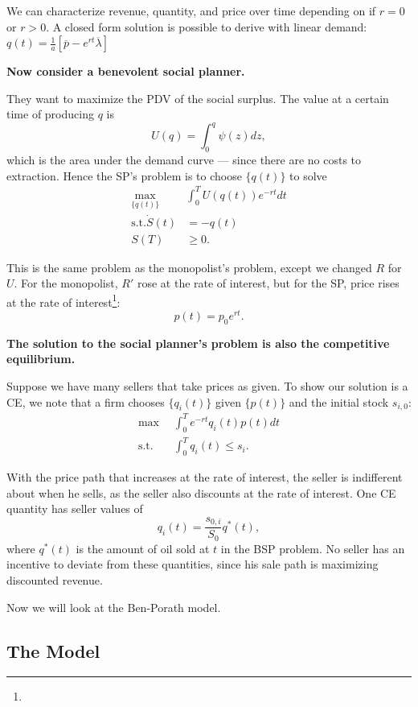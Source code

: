 \documentclass{tufte-handout}
\theoremstyle{definition}
\begin{document}
We can characterize revenue, quantity, and price over time depending on if $r=0$ or $r > 0$. A closed form solution is possible to derive with linear demand: $q(t) = \frac{1}{a} \left[ \overline{p} - e^{rt} \overline{\lambda} \right] $

\textbf{Now consider a benevolent social planner.}

They want to maximize the PDV of the social surplus. The value at a certain time of producing $q$ is \[
	U(q) = \int_{0}^{q} \psi(z)dz 
,\] which is the area under the demand curve --- since there are no costs to extraction. Hence the SP's problem is to choose $\{q(t)\}$ to solve
\begin{align*}
	\max_{\{q(t)\}} &\int_{0}^{T} U(q(t))e^{-rt}dt  \\
	\text{s.t.} \dot{S}(t) &=  -q(t) \\
	S(T) &\ge 0
.\end{align*}

This is the same problem as the monopolist's problem, except we changed $R$ for $U$. For the monopolist, $R'$ rose at the rate of interest, but for the SP, price rises at the rate of interest\footnote{}: \[
	p(t) = p_0 e^{rt}
.\] 

\textbf{The solution to the social planner's problem is also the competitive equilibrium.}

Suppose we have many sellers that take prices as given. To show our solution is a CE, we note that a firm chooses $\{q_i(t)\}$ given $\{p(t)\}$ and the initial stock $s_{i,0}$:
\begin{align*}
	\max &\int_{0}^{T} e^{-rt} q_i(t) p(t)dt \\
	\text{s.t.} \quad &\int_{0}^{T} q_i(t) \le s_i 
.\end{align*}

With the price path that increases at the rate of interest, the seller is indifferent about when he sells, as the seller also discounts at the rate of interest. One CE quantity has seller values of \[
	q_i(t) = \frac{s_{0,i}}{S_0} q^*(t)
,\] where $q^*(t)$ is the amount of oil sold at $t$ in the BSP problem. No seller has an incentive to deviate from these quantities, since his sale path is maximizing discounted revenue.

Now we will look at the Ben-Porath model. 

\subsection{The Model}
\end{document}
